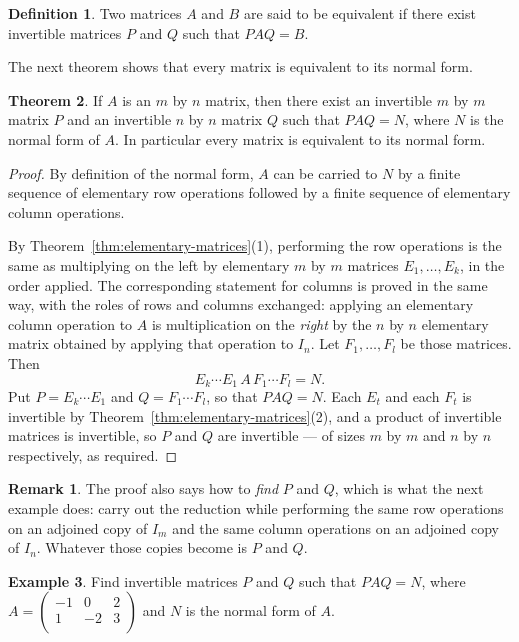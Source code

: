 \documentclass[11pt,a4paper]{article}
\theoremstyle{definition}
\newtheorem{thm}{Theorem}[subsection]
\newtheorem{defn}[thm]{Definition}
\newtheorem{exa}[thm]{Example}
\newtheorem*{remark}{Remark}
\begin{document}
\begin{defn}
Two matrices $A$ and $B$ are said to be equivalent if there exist invertible matrices $P$ and $Q$ such that $PAQ=B$.
\end{defn}
The next theorem shows that every matrix is equivalent to its normal form.

\begin{thm}\label{thm:normal-form}
If $A$ is an $m$ by $n$ matrix, then there exist an invertible $m$ by $m$ matrix
$P$ and an invertible $n$ by $n$ matrix $Q$ such that $PAQ=N$, where $N$ is the
normal form of $A$. In particular every matrix is equivalent to its normal
form.
\end{thm}

\begin{proof}
By definition of the normal form, $A$ can be carried to $N$ by a finite
sequence of elementary row operations followed by a finite sequence of
elementary column operations.

By Theorem~\ref{thm:elementary-matrices}(1), performing the row operations is
the same as multiplying on the left by elementary $m$ by $m$ matrices
$E_1,\dots,E_k$, in the order applied. The corresponding statement for columns
is proved in the same way, with the roles of rows and columns exchanged:
applying an elementary column operation to $A$ is multiplication on the
\emph{right} by the $n$ by $n$ elementary matrix obtained by applying that
operation to $I_n$. Let $F_1,\dots,F_l$ be those matrices. Then
$$E_k\cdots E_1\,A\,F_1\cdots F_l=N.$$
Put $P=E_k\cdots E_1$ and $Q=F_1\cdots F_l$, so that $PAQ=N$. Each $E_t$ and
each $F_t$ is invertible by Theorem~\ref{thm:elementary-matrices}(2), and a
product of invertible matrices is invertible, so $P$ and $Q$ are invertible ---
of sizes $m$ by $m$ and $n$ by $n$ respectively, as required.
\end{proof}

\begin{remark}
The proof also says how to \emph{find} $P$ and $Q$, which is what the next
example does: carry out the reduction while performing the same row operations
on an adjoined copy of $I_m$ and the same column operations on an adjoined copy
of $I_n$. Whatever those copies become is $P$ and $Q$.
\end{remark}


\begin{exa}
Find invertible matrices $P$ and $Q$ such that $PAQ=N$, where $A=
\begin{pmatrix}
-1&0&2\\1&-2&3\\
\end{pmatrix}
$ and $N$ is the normal form of $A$.
\end{exa}
\end{document}
